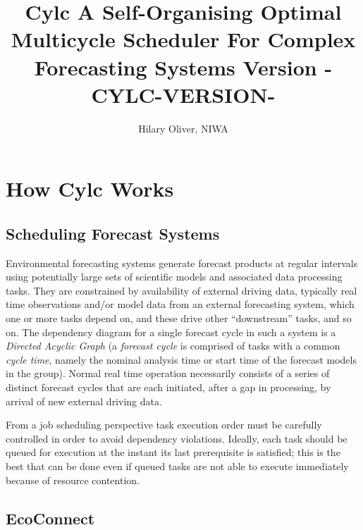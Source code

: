 \documentclass[11pt,a4paper]{article}
\title{Cylc \linebreak A Self-Organising Optimal Multicycle Scheduler \linebreak For Complex Forecasting Systems \linebreak Version -CYLC-VERSION-}
\author{Hilary Oliver, NIWA}
\begin{document}
\maketitle

\pagebreak



\pagebreak
\tableofcontents
\listoffigures

\pagebreak
\section{How Cylc Works} 
\label{HowCylcWorks}

\subsection{Scheduling Forecast Systems} 
\label{SchedulingForecastSystems}

Environmental forecasting systems generate forecast products at regular
intervals using potentially large sets of scientific models and
associated data processing tasks. They are constrained by availability
of external driving data, typically real time observations and/or model
data from an external forecasting system, which one or more tasks depend
on, and these drive other ``downstream'' tasks, and so on. The
dependency diagram for a single forecast cycle in such a system 
is a {\em Directed Acyclic Graph} (a {\em forecast cycle} is comprised
of tasks with a common {\em cycle time}, namely the nominal analysis
time or start time of the forecast models in the group). Normal real
time operation necessarily consists of a series of distinct forecast
cycles that are each initiated, after a gap in processing, by arrival of
new external driving data.

From a job scheduling perspective task execution order must be carefully
controlled in order to avoid dependency violations. Ideally, each task
should be queued for execution at the instant its last prerequisite is
satisfied; this is the best that can be done even if queued tasks are
not able to execute immediately because of resource contention.


\subsection{EcoConnect} 
\label{EcoConnect}
\end{document}
